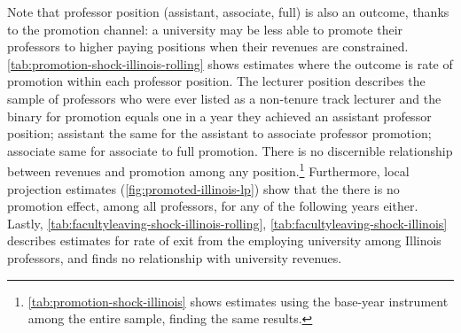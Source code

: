 Note that professor position (assistant, associate, full) is also an outcome, thanks to the promotion channel: a university may be less able to promote their professors to higher paying positions when their revenues are constrained.
\autoref{tab:promotion-shock-illinois-rolling} shows estimates where the outcome is rate of promotion within each professor position.
The lecturer position describes the sample of professors who were ever listed as a non-tenure track lecturer and the binary for promotion equals one in a year they achieved an assistant professor position; assistant the same for the assistant to associate professor promotion; associate same for associate to full promotion.
There is no discernible relationship between revenues and promotion among any position.\footnote{
    \autoref{tab:promotion-shock-illinois} shows estimates using the base-year instrument among the entire sample, finding the same results.
}
Furthermore, local projection estimates (\autoref{fig:promoted-illinois-lp}) show that the there is no promotion effect, among all professors, for any of the following years either.
Lastly, \autoref{tab:facultyleaving-shock-illinois-rolling}, \ref{tab:facultyleaving-shock-illinois} describes estimates for rate of exit from the employing university among Illinois professors, and finds no relationship with university revenues.
